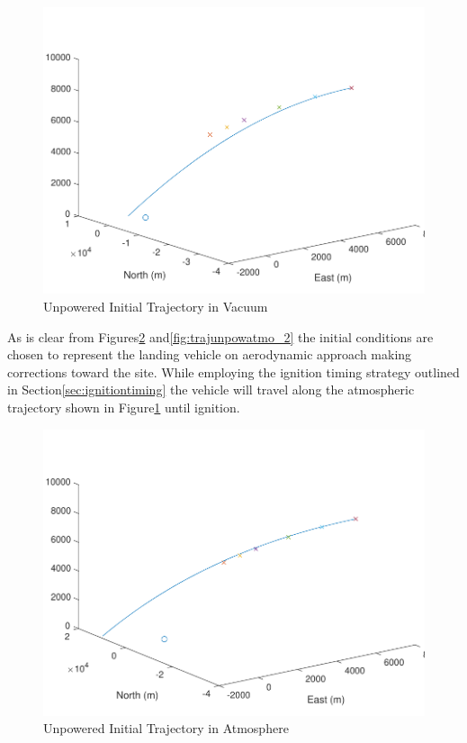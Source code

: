 \begin{figure}[H]
	\centering
	\begin{minipage}{4.5 in}
		\includegraphics[width=\linewidth]{Figures/trajunpowvac_1.pdf}
		\caption{Unpowered Initial Trajectory in Vacuum \label{fig:trajunpowvac_1} }
	\end{minipage}
\end{figure}

As is clear from Figures\:\ref{fig:trajunpowatmo_1} and\:\:\ref{fig:trajunpowatmo_2} the initial conditions are chosen to represent the landing vehicle on aerodynamic approach making corrections toward the site. While employing the ignition timing strategy outlined in Section\:\ref{sec:ignitiontiming} the vehicle will travel along the atmospheric trajectory shown in Figure\:\ref{fig:trajunpowvac_1} until ignition.

\begin{figure}[H]
	\centering
	\begin{minipage}{4.5 in}
		\includegraphics[width=\linewidth]{Figures/trajunpowatmo_1.pdf}
		\caption{Unpowered Initial Trajectory in Atmosphere \label{fig:trajunpowatmo_1} }
	\end{minipage}
\end{figure}

